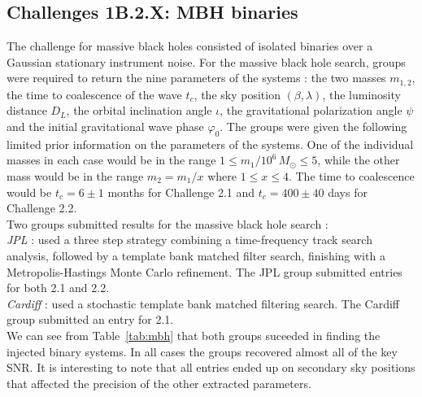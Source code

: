 \documentclass{iopart}
\begin{document}
\subsection{Challenges 1B.2.X: MBH binaries}
The challenge for massive black holes consisted of isolated binaries over a Gaussian stationary instrument noise.  For the massive black hole search, groups were required to return the nine parameters of the systems : the two masses $m_{1,2}$, the time to coalescence of the wave $t_c$, the sky position $(\beta,\lambda)$, the luminosity distance $D_L$, the orbital inclination angle $\iota$, the gravitational polarization angle $\psi$ and the initial gravitational wave phase $\varphi_0$.  The groups were given the following limited prior information on the parameters of the systems.  One of the individual masses in each case would be in the range $1\leq m_1/10^6\,M_{\odot}\leq 5$, while the other mass would be in the range $m_2=m_1/x$ where $1\leq x\leq 4$.  The time to coalescence  would be $t_c = 6\pm 1$ months for Challenge 2.1 and $t_c=400\pm40$ days for Challenge 2.2.\\

\noindent Two groups submitted results for the massive black hole search :\\

\noindent\emph{ JPL} : used a three step strategy combining a time-frequency track search analysis, followed by a template bank matched filter search, finishing with a Metropolis-Hastings Monte Carlo refinement.  The JPL group submitted entries for both 2.1 and 2.2.\\
\emph{ Cardiff} : used a stochastic template bank matched filtering search.  The Cardiff group submitted an entry for 2.1.\\

We can see from Table~\ref{tab:mbh} that both groups suceeded in finding the injected binary systems.  In all cases the groups recovered almost all of the key SNR.  It is interesting to note that all entries ended up on secondary sky positions that affected the precision of the other extracted parameters.
\end{document}
